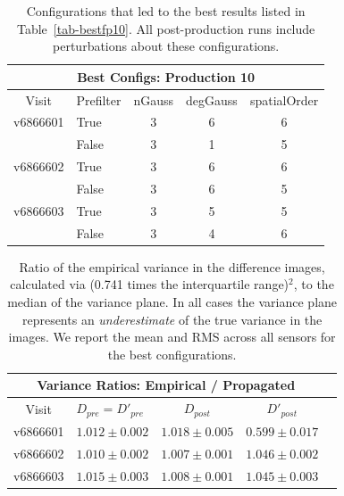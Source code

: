 \documentclass[prd, nofootinbib, floatfix, 11pt,tightenlines,times]{article}
\begin{document}
\begin{table}
\centering
\begin{tabular}{clccc}
\hline
\multicolumn{5}{|c|}{Best Configs: Production 10} \\
\hline
Visit    & Prefilter & nGauss & degGauss & spatialOrder \\
\hline
v6866601 & True      & 3      & 6        & 6 \\
         & False     & 3      & 1        & 5 \\
v6866602 & True      & 3      & 6        & 6 \\
         & False     & 3      & 6        & 5 \\
v6866603 & True      & 3      & 5        & 5 \\
         & False     & 3      & 4        & 6 \\
\end{tabular}
\caption{Configurations that led to the best results listed in
  Table~\ref{tab-bestfp10}.  All post-production runs include
  perturbations about these configurations. \label{tab-bestconfig10}}
\end{table}

\clearpage

\begin{table}
\centering
\begin{tabular}{clccc}
\hline
\multicolumn{4}{|c|}{Variance Ratios: Empirical / Propagated} \\
\hline
Visit    & $D_{pre} = D'_{pre}$ & $D_{post}$ & $D'_{post}$ \\
\hline
v6866601 &$1.012 \pm 0.002$&$1.018 \pm 0.005$&$0.599 \pm 0.017$ \\
v6866602 &$1.010 \pm 0.002$&$1.007 \pm 0.001$&$1.046 \pm 0.002$ \\
v6866603 &$1.015 \pm 0.003$&$1.008 \pm 0.001$&$1.045 \pm 0.003$ \\
\end{tabular}
\caption{Ratio of the empirical variance in the difference images,
  calculated via (0.741 times the interquartile range)$^2$, to the
  median of the variance plane.  In all cases the variance plane
  represents an {\it underestimate} of the true variance in the
  images.  We report the mean and RMS across all sensors for the best
  configurations.  }
\label{tab-variance1}
\end{table}
\end{document}
